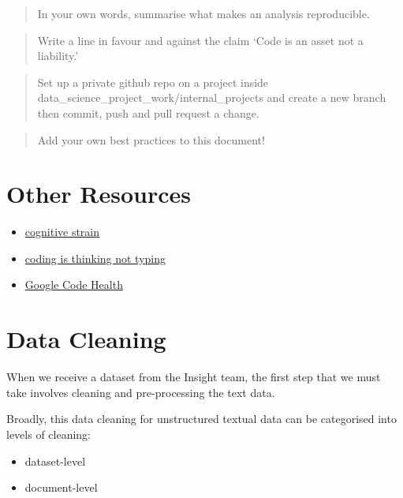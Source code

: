 \documentclass[
  letterpaper,
  DIV=11,
  numbers=noendperiod]{scrreprt}
\providecommand{\tightlist}{%
  \setlength{\itemsep}{0pt}\setlength{\parskip}{0pt}}\usepackage{longtable,booktabs,array}
\begin{document}
\begin{quote}
In your own words, summarise what makes an analysis reproducible.
\end{quote}

\begin{quote}
Write a line in favour and against the claim `Code is an asset not a
liability.'
\end{quote}

\begin{quote}
Set up a private github repo on a project inside
data\_science\_project\_work/internal\_projects and create a new branch
then commit, push and pull request a change.
\end{quote}

\begin{quote}
Add your own best practices to this document!
\end{quote}

\chapter{Other Resources}\label{other-resources}

\begin{itemize}
\tightlist
\item
  \href{https://link.springer.com/article/10.1007/s10648-019-09465-5}{cognitive
  strain}
\item
  \href{https://news.ycombinator.com/item?id=40103407\#:~:text=Programming\%20Is\%20Mostly\%20Thinking\%20(2014)\%20\%7C\%20Hacker\%20News&text=While\%20that\%20may\%20be\%20true,at\%20all\%20is\%20extremely\%20limited.}{coding
  is thinking not typing}
\item
  \href{https://testing.googleblog.com/2017/04/code-health-googles-internal-code.html}{Google
  Code Health}
\end{itemize}

\chapter{Data Cleaning}\label{data-cleaning}

When we receive a dataset from the Insight team, the first step that we
must take involves cleaning and pre-processing the text data.

Broadly, this data cleaning for unstructured textual data can be
categorised into levels of cleaning:

\begin{itemize}
\tightlist
\item
  dataset-level
\item
  document-level
\end{itemize}
\end{document}
